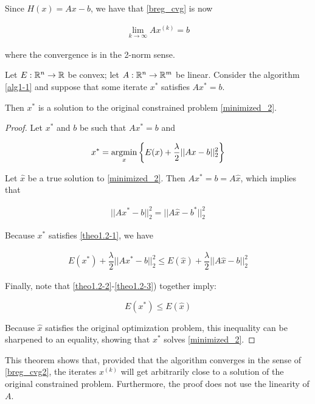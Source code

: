 Since $H(x) = Ax-b$, we have that \eqref{breg_cvg}  is now

\begin{align}\label{breg_cvg2}
\lim_{k \to \infty} Ax^{(k)} = b
\end{align}

where the convergence is in the 2-norm sense.

\begin{theorem} \label{th:1.2}
Let $E:\mathbb{R}^n \to \mathbb{R}$ be convex; let $A: \mathbb{R}^n \to \mathbb{R}^m$ be linear. Consider the algorithm \eqref{alg1-1} and suppose that some iterate $x^*$ satisfies $Ax^* = b$.

Then $x^*$ is a solution to the original constrained problem \eqref{minimized_2}.
\end{theorem}
\begin{proof}
Let $x^*$ and $b$ be such that $Ax^* = b$ and

\begin{align}
x^* = \mathop{\mathrm{argmin}}\limits_x \left\{ E(x) + \dfrac{\lambda}{2}||Ax-b||_2^2 \right\} \label{theo1.2-1}
\end{align}

Let $\hat{x}$ be a true solution to \eqref{minimized_2}. Then $Ax^* = b = A\hat{x}$, which implies that

\begin{align}
||Ax^* - b ||_2^2 = ||A\hat{x}-b^*||_2^2 \label{theo1.2-2}
\end{align}

Because $x^*$ satisfies \eqref{theo1.2-1}, we have

\begin{align}
E(x^*) + \dfrac{\lambda}{2}||Ax^*-b||_2^2 \leq E(\hat{x}) + \dfrac{\lambda}{2}||A\hat{x}-b||_2^2 \label{theo1.2-3}
\end{align}

Finally, note that \eqref{theo1.2-2}-\eqref{theo1.2-3}) together imply:

$$E(x^*) \leq E(\hat{x})$$

Because $\hat{x}$ satisfies the original optimization problem, this inequality can be sharpened to an equality, showing that $x^*$ solves \eqref{minimized_2}.
\end{proof}

This theorem shows that, provided that the algorithm converges in the sense of \eqref{breg_cvg2}, the iterates $x^{(k)}$ will get arbitrarily close to a solution of the original constrained problem. Furthermore, the proof does not use the linearity of $A$.

